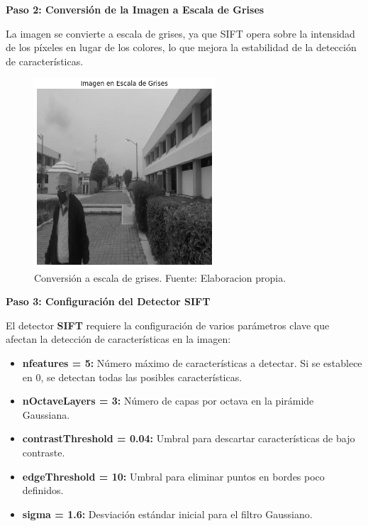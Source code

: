 \documentclass[a4paper]{article}
\begin{document}
\textbf{Paso 2: Conversión de la Imagen a Escala de Grises}

La imagen se convierte a escala de grises, ya que SIFT opera sobre la intensidad de los píxeles en lugar de los colores, lo que mejora la estabilidad de la detección de características.

\begin{figure}[H]
    \centering
    \includegraphics[width=0.6\textwidth]{images/sift_paso_2.png}
    \caption{Conversión a escala de grises. Fuente: Elaboracion propia.}
\end{figure}

\textbf{Paso 3: Configuración del Detector SIFT}
\par\vspace{0.5cm}

El detector \textbf{SIFT} requiere la configuración de varios parámetros clave que afectan la detección de características en la imagen:

\begin{itemize}
    \item \textbf{nfeatures = 5:} Número máximo de características a detectar. Si se establece en 0, se detectan todas las posibles características.
    \item \textbf{nOctaveLayers = 3:} Número de capas por octava en la pirámide Gaussiana.
    \item \textbf{contrastThreshold = 0.04:} Umbral para descartar características de bajo contraste.
    \item \textbf{edgeThreshold = 10:} Umbral para eliminar puntos en bordes poco definidos.
    \item \textbf{sigma = 1.6:} Desviación estándar inicial para el filtro Gaussiano.
\end{itemize}
\end{document}
